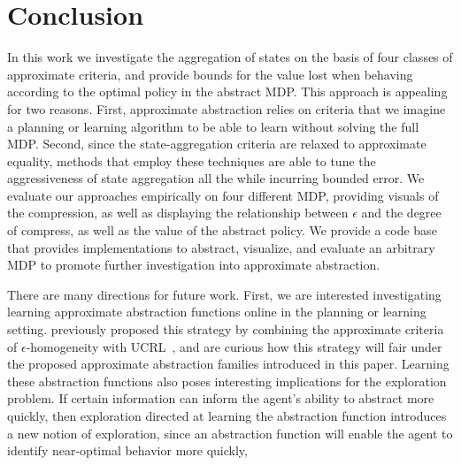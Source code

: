 \section{Conclusion}

In this work we investigate the aggregation of states on the basis of four classes of approximate criteria, and provide bounds for the value lost when behaving according to the optimal policy in the abstract \ac{MDP}. This approach is appealing for two reasons. First, approximate abstraction relies on criteria that we imagine a planning or learning algorithm to be able to learn without solving the full \ac{MDP}. Second, since the state-aggregation criteria are relaxed to approximate equality, methods that employ these techniques are able to tune the aggressiveness of state aggregation all the while incurring bounded error. We evaluate our approaches empirically on four different \acs{MDP}, providing visuals of the compression, as well as displaying the relationship between $\epsilon$ and the degree of compress, as well as the value of the abstract policy. We provide a code base that provides implementations to abstract, visualize, and evaluate an arbitrary MDP to promote further investigation into approximate abstraction.

There are many directions for future work. First, we are interested investigating learning approximate abstraction functions online in the planning or learning setting. \citeauthor{ortner2013adaptive} previously proposed this strategy by combining the approximate criteria of $\epsilon$-homogeneity with UCRL~\cite{ortner2007logarithmic}, and are curious how this strategy will fair under the proposed approximate abstraction families introduced in this paper. Learning these abstraction functions also poses interesting implications for the exploration problem. If certain information can inform the agent's ability to abstract more quickly, then exploration directed at learning the abstraction function introduces a new notion of exploration, since an abstraction function will enable the agent to identify near-optimal behavior more quickly, 

